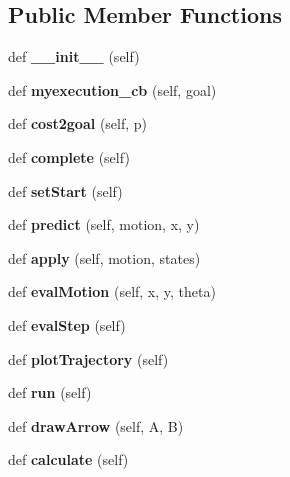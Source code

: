 \subsection*{Public Member Functions}
\begin{DoxyCompactItemize}
\item 
\mbox{\label{classpolyfit_1_1Action_a62f7205a122d0964a7235d438163e1fa}} 
def {\bfseries \+\_\+\+\_\+init\+\_\+\+\_\+} (self)
\item 
\mbox{\label{classpolyfit_1_1Action_a54326e32f816911f53cd1b17d91ae7cb}} 
def {\bfseries myexecution\+\_\+cb} (self, goal)
\item 
\mbox{\label{classpolyfit_1_1Action_a15c2a2daa36223bd772bba3934c43958}} 
def {\bfseries cost2goal} (self, p)
\item 
\mbox{\label{classpolyfit_1_1Action_a9281b2dd890c406db377e2cbcfb83aaf}} 
def {\bfseries complete} (self)
\item 
\mbox{\label{classpolyfit_1_1Action_a7614eb119eb9fb6c66e9339e604a3c97}} 
def {\bfseries set\+Start} (self)
\item 
\mbox{\label{classpolyfit_1_1Action_a68dd1ca938aa77500bbe2beb8a97cdc3}} 
def {\bfseries predict} (self, motion, x, y)
\item 
\mbox{\label{classpolyfit_1_1Action_a2aa6ed88c720fd2f7ec026f6ce38164b}} 
def {\bfseries apply} (self, motion, states)
\item 
\mbox{\label{classpolyfit_1_1Action_a0b2d1187aae443c8863ae5da5f1cce2d}} 
def {\bfseries eval\+Motion} (self, x, y, theta)
\item 
\mbox{\label{classpolyfit_1_1Action_a30f5d912a21c94bc397d4d44f57fb587}} 
def {\bfseries eval\+Step} (self)
\item 
\mbox{\label{classpolyfit_1_1Action_a458e82615d4fe08460047c7357bcf13b}} 
def {\bfseries plot\+Trajectory} (self)
\item 
\mbox{\label{classpolyfit_1_1Action_a07a43fb64e3ab45c5fe62185ca25b41b}} 
def {\bfseries run} (self)
\item 
\mbox{\label{classpolyfit_1_1Action_a2fcaf278ac12769c5f784171e3e350e1}} 
def {\bfseries draw\+Arrow} (self, A, B)
\item 
\mbox{\label{classpolyfit_1_1Action_ac331a10c4e772825ffd69b8d65b04e03}} 
def {\bfseries calculate} (self)
\end{DoxyCompactItemize}

